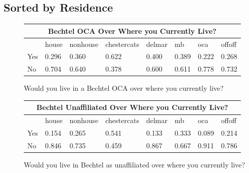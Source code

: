 \documentclass[12pt]{article} %
\begin{document}
\subsection{Sorted by Residence}

\begin{figure}[H]
	\begin{center}
\begin{tabular}{|m{1.3 cm}|m{1.7 cm}|m{2.0 cm}|m{2.3 cm}|m{1.3 cm}|m{1.3 cm}|m{1.3 cm}|m{1.3 cm} |}
\hline
\multicolumn{8}{|c|}{Bechtel OCA Over Where you Currently Live?}\\ \hline
& house& nonhouse& chestercats& delmar& mb& oca& offoff\\ \hline
Yes   &  0.296 &  0.360 &  0.622 &  0.400 &  0.389 &  0.222 &  0.268\\ \hline
No   &  0.704 &  0.640 &  0.378 &  0.600 &  0.611 &  0.778 &  0.732\\ \hline

\end{tabular}
\end{center}
	\caption{Would you live in a Bechtel OCA over where you currently live?}

\end{figure}

\vspace{-7mm}

\begin{figure}[H]
	\begin{center}
\begin{tabular}{|m{1.3 cm}|m{1.3 cm}|m{2 cm}|m{2.5 cm}|m{1.3 cm}|m{1.3 cm}|m{1.3 cm}|m{1.3 cm} |}
\hline
\multicolumn{8}{|c|}{Bechtel Unaffiliated Over Where you Currently Live?}\\ \hline
& house& nonhouse& chestercats& delmar& mb& oca& offoff\\ \hline
Yes   &  0.154 &  0.265 &  0.541 &  0.133 &  0.333 &  0.089 &  0.214\\ \hline
No   &  0.846 &  0.735 &  0.459 &  0.867 &  0.667 &  0.911 &  0.786\\ \hline
\end{tabular}
\end{center}
	\caption{Would you live in Bechtel as unaffiliated over where you currently live?}
\end{figure}
\end{document}
